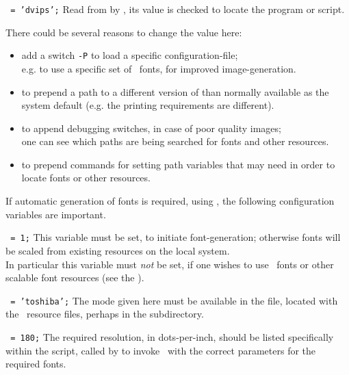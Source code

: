 \begin{htmllist}
\item [\fn{\$DVIPS}\texttt{ = 'dvips';}]
Read from  by ,
its value is checked to locate the  program or script.

\smallskip\noindent
There could be several reasons to change the value here:
\begin{itemize}
\item
add a switch \texttt{-P} to load a specific configuration-file;\\
e.g. to use a specific set of \PS\ fonts, for improved image-generation.
\item
to prepend a path to a different version of  than normally
available as the system default (e.g. the printing requirements are different).
\item
to append debugging switches, in case of poor quality images;\\
one can see which paths are being searched for fonts and other resources.
\item
to prepend commands for setting path variables that  may need
in order to locate fonts or other resources.
\end{itemize}

If automatic generation of fonts is required, using \MF, the following
configuration variables are important.
%
\begin{htmllist}%
%
\item [\fn{\$PK\_GENERATION}\texttt{ = 1;}\label{pkgen}]
This variable must be set, to initiate font-generation; otherwise fonts
will be scaled from existing resources on the local system.\\
In particular this variable must \emph{not} be set, if one wishes to use
\PS\ fonts or other scalable font resources
(see the  ).

\item [\fn{\$DVIPS\_MODE}\texttt{ = 'toshiba';}]
The mode given here must be available in the  file,
located with the \MF\ resource files, perhaps in the  subdirectory.

\item [\fn{\$METAFONT\_DPI}\texttt{ = 180;}]
The required resolution, in dots-per-inch, should be listed specifically
within the  script, called by  to invoke \MF\ with
the correct parameters for the required fonts.
%
\end{htmllist}



\end{htmllist}
